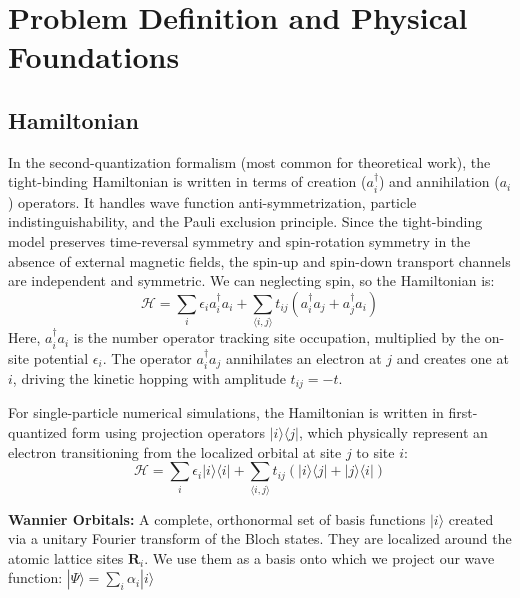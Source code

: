 \section{Problem Definition and Physical Foundations}
\label{sec:foundations}

\subsection{Hamiltonian}
\label{subsec:hamiltonian}


In the second-quantization formalism (most common for theoretical work), the tight-binding Hamiltonian is written in terms of creation ($a_i^\dagger$) and annihilation ($a_i$) operators. It handles wave function anti-symmetrization, particle indistinguishability, and the Pauli exclusion principle. Since the tight-binding model preserves time-reversal symmetry and spin-rotation symmetry in the absence of external magnetic fields, the spin-up and spin-down transport channels are independent and symmetric. We can neglecting spin, so the Hamiltonian is:
\begin{equation}
\mathcal{H} = \sum_{i} \epsilon_i a_i^\dagger a_i + \sum_{\langle i,j \rangle} t_{ij} \left( a_i^\dagger a_j + a_j^\dagger a_i \right)
\end{equation}
Here, $a_i^\dagger a_i$ is the number operator tracking site occupation, multiplied by the on-site potential $\epsilon_i$. The operator $a_i^\dagger a_j$ annihilates an electron at $j$ and creates one at $i$, driving the kinetic hopping with amplitude $t_{ij} = -t$.

For single-particle numerical simulations, the Hamiltonian is written in first-quantized form using projection operators $|i\rangle\langle j|$, which physically represent an electron transitioning from the localized orbital at site $j$ to site $i$:
\begin{equation}
\mathcal{H} = \sum_{i} \epsilon_i |i\rangle\langle i| + \sum_{\langle i,j \rangle} t_{ij} \left( |i\rangle\langle j| + |j\rangle\langle i| \right)
\end{equation}

\textbf{Wannier Orbitals:} A complete, orthonormal set of basis functions $|i\rangle$ created via a unitary Fourier transform of the Bloch states. They are localized around the atomic lattice sites $\mathbf{R}_i$. We use them as a basis onto which we project our wave function: $|\Psi\rangle = \sum_i \alpha_i |i\rangle$

